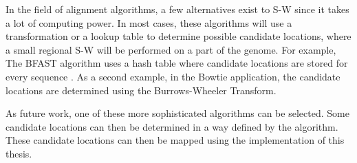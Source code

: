 In the field of alignment algorithms, a few alternatives exist to S-W since it takes a lot of computing power. In most cases, these algorithms will use a transformation or a lookup table to determine possible candidate locations, where a small regional S-W will be performed on a part of the genome. For example, The BFAST algorithm uses a hash table where candidate locations are stored for every sequence \cite{fpgaImpl}. As a second example, in the Bowtie application, the candidate locations are determined using the Burrows-Wheeler Transform.

As future work, one of these more sophisticated algorithms can be selected. Some candidate locations can then be determined in a way defined by the algorithm. These candidate locations can then be mapped using the implementation of this thesis.